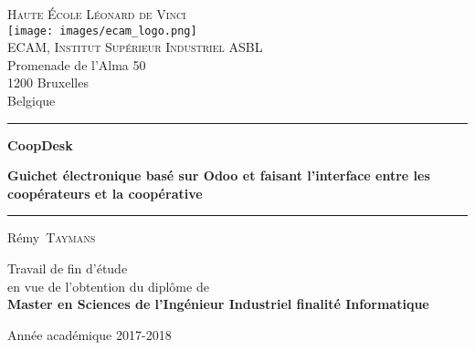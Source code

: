 \documentclass[
    a4paper,
    11pt,
    oneside
]{report}
\begin{document}
    \begin{titlepage}
        \sffamily

        \begin{center}
            \large
            \textsc{Haute École Léonard de Vinci} \\
            \centering
            \texttt{[image: images/ecam\_logo.png]} \\
            \textsc{ECAM, Institut Supérieur Industriel ASBL} \\
            {\small
                Promenade de l'Alma 50 \\
                1200 Bruxelles \\
                Belgique
            }
        \end{center}


        \begin{center}
            \rule{\textwidth}{1pt}
            {\huge\bfseries
                CoopDesk \par
            }
            \vspace{\baselineskip}
            {\LARGE\bfseries
                Guichet électronique basé sur Odoo et faisant
                l'interface entre les coopérateurs et la coopérative
            }
            \rule{\textwidth}{1pt}
        \end{center}


        \begin{center}
            {\Large
                Rémy~\textsc{Taymans}
            }
        \end{center}


        \begin{center}
            {\large
                Travail de fin d'étude \\
                en vue de l'obtention du diplôme de \\
                \textbf{
                    Master en Sciences de l'Ingénieur Industriel
                    finalité Informatique
                }
            }
        \end{center}


        \vfill

        \begin{center}
            {\large
                Année académique 2017-2018
            }
        \end{center}

        \normalfont
        \thispagestyle{empty}
    \end{titlepage}
\end{document}
